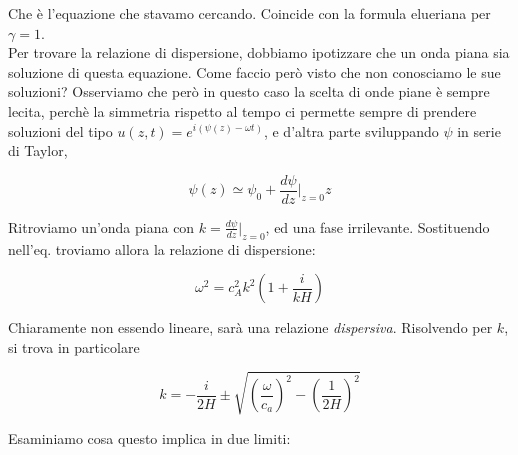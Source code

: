 \documentclass{report}
\begin{document}
Che è l'equazione che stavamo cercando. Coincide con la formula elueriana per $\gamma=1$. \\

Per trovare la relazione di dispersione, dobbiamo ipotizzare che un onda piana sia soluzione di questa equazione. Come faccio però visto che non conosciamo le sue soluzioni? Osserviamo che però in questo caso la scelta di onde piane è sempre lecita, perchè la simmetria rispetto al tempo ci permette sempre di prendere soluzioni del tipo $u(z, t) = e^{i(\psi(z)- \omega t)}$, e d'altra parte sviluppando $\psi$ in serie di Taylor, 

\begin{equation}
    \psi(z) \simeq \psi_0 + \frac{d\psi}{dz}\biggr|_{z=0}z
\end{equation}

Ritroviamo un'onda piana con $ k = \frac{d\psi}{dz}\biggr|_{z=0}$, ed una fase irrilevante. Sostituendo nell'eq. troviamo allora la relazione di dispersione: 

\begin{equation}
    \omega^2 = c_A^2 k^2\left(1 + \frac{i}{kH} \right)
\end{equation}

Chiaramente non essendo lineare, sarà una relazione \emph{dispersiva}. Risolvendo per $k$, si trova in particolare

\begin{equation}
    k = -\frac{i}{2H} \pm \sqrt{\left(\frac{\omega}{c_a}\right)^2 - \left(\frac{1}{2H}\right)^2}
\end{equation}

Esaminiamo cosa questo implica in due limiti: 
\end{document}
